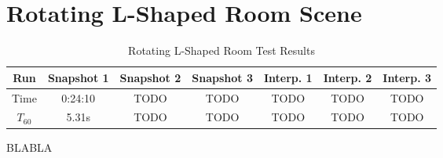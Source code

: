 \section{Rotating L-Shaped Room Scene}

\begin{table}[t!]\label{tbl:LScene}
\centering
    \begin{tabular}{| c | c | c | c | c | c | c |}
        \hline
        Run & Snapshot 1 & Snapshot 2 & Snapshot 3 & Interp. 1 & Interp. 2 & Interp. 3 \\
        \hline
        Time & 0:24:10 & TODO & TODO & TODO & TODO & TODO \\
        \hline
        \(T_{60}\) & 5.31s & TODO & TODO & TODO & TODO & TODO \\
        \hline
    \end{tabular}
    \caption{Rotating L-Shaped Room Test Results}
\end{table}

BLABLA